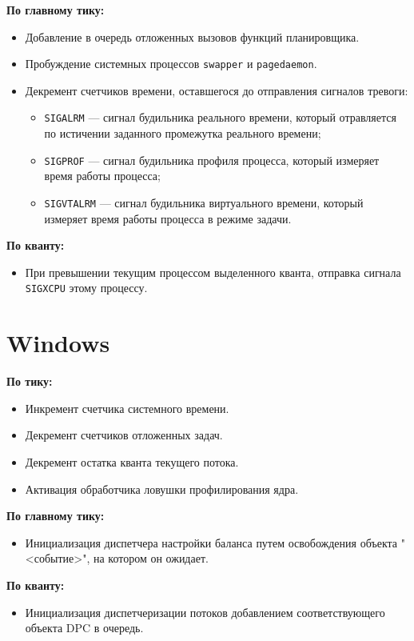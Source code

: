\documentclass[a4paper,oneside,14pt]{extreport}
\newcommand{\code}[1]{\texttt{#1}}
\begin{document}
\textbf{По главному тику:}
\begin{itemize}
	\item Добавление в очередь отложенных вызовов функций планировщика.
	\item Пробуждение системных процессов \code{swapper} и \code{pagedaemon}.
	\item Декремент счетчиков времени, оставшегося до отправления сигналов тревоги:
	\begin{itemize}
		\item \code{SIGALRM} --- сигнал будильника реального времени, который отравляется по истичении заданного промежутка реального времени;
		\item \code{SIGPROF} --- сигнал будильника профиля процесса, который измеряет время работы процесса;
		\item \code{SIGVTALRM} --- сигнал будильника виртуального времени, который измеряет время работы процесса в режиме задачи.
	\end{itemize}
\end{itemize}

\textbf{По кванту:}
\begin{itemize}
	\item При превышении текущим процессом выделенного кванта, отправка сигнала \code{SIGXCPU} этому процессу.
\end{itemize}

\section{Windows}

\textbf{По тику:}
\begin{itemize}
	\item Инкремент счетчика системного времени.
	\item Декремент счетчиков отложенных задач.
	\item Декремент остатка кванта текущего потока.
	\item Активация обработчика ловушки профилирования ядра.
\end{itemize}

\textbf{По главному тику:}
\begin{itemize}
	\item Инициализация диспетчера настройки баланса путем освобождения объекта "<событие>", на котором он ожидает.
\end{itemize}

\textbf{По кванту:}
\begin{itemize}
	\item Инициализация диспетчеризации потоков добавлением соответствующего объекта DPC в очередь.
\end{itemize}
\end{document}
